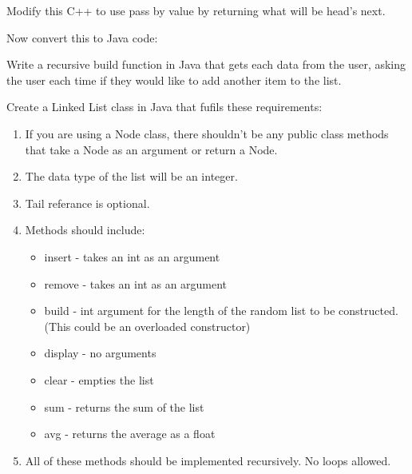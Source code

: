 \documentclass[../../main.tex]{subfiles}
\begin{document}
\begin{steps}
      Modify this C++ to use pass by value by returning what will be head's next.\\
      \vspace{10cm}
   \item Now convert this to Java code:\\
      \vspace{10cm}
   \item Write a recursive build function in Java that gets each data from the user, asking the user
      each time if they would like to add another item to the list.\\
      \vspace{10cm}
   \item Create a Linked List class in Java that fufils these requirements:
   \begin{enumerate}[label=\Alph*.]
      \item If you are using a Node class, there shouldn't be any public
         class methods that take a Node as an argument or return a Node.
      \item The data type of the list will be an integer.
      \item Tail referance is optional.
      \item Methods should include:
         \begin{itemize}
            \item insert - takes an int as an argument
            \item remove - takes an int as an argument
            \item build - int argument for the length of the random list to be constructed. (This could
               be an overloaded constructor)
            \item display - no arguments
            \item clear - empties the list
            \item sum - returns the sum of the list
            \item avg - returns the average as a float
         \end{itemize}
      \item All of these methods should be implemented recursively. No loops allowed.
   \end{enumerate}
\end{steps}
\end{document}
